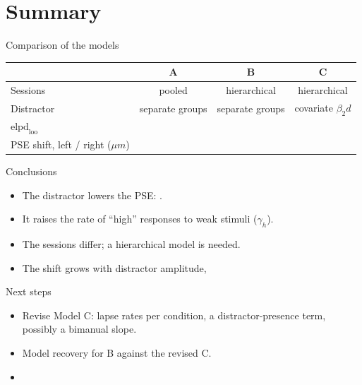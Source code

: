 \section{Summary}

\begin{frame}{Comparison of the models}
  \centering
  \begin{tabular}{lccc}
    \toprule
     & A & B & C \\
    \midrule
    Sessions & pooled & hierarchical & hierarchical \\
    Distractor & separate groups & separate groups & covariate $\beta_2 d$ \\
    $\text{elpd}_\text{loo}$ & \todo{} & \todo{} & \todo{} \\
    PSE shift, left / right ($\mu m$) & \todo{} & \todo{} & \todo{} \\
    \bottomrule
  \end{tabular}
  \vfill
  \raggedright
\end{frame}

\begin{frame}{Conclusions}
  \begin{itemize}
    \item The distractor lowers the PSE: .
    \item It raises the rate of ``high'' responses to weak stimuli ($\gamma_h$).
    \item The sessions differ; a hierarchical model is needed.
    \item The shift grows with distractor amplitude, 
  \end{itemize}
\end{frame}

\begin{frame}{Next steps}
  \begin{itemize}
    \item Revise Model C: lapse rates per condition, a distractor-presence term,
          possibly a bimanual slope.
    \item Model recovery for B against the revised C.
    \item {}
  \end{itemize}
\end{frame}
